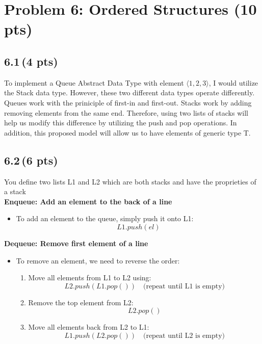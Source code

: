 \documentclass[12pt]{article}
\begin{document}
\section*{Problem 6: Ordered Structures (10 pts)}

\subsection*{6.1\,(4 pts)}

To implement a Queue Abstract Data Type with element  $\langle 1,2,3 \rangle$, I would utilize the Stack data type. However, these two different data types operate differently. Queues work with the priniciple of first-in and first-out. Stacks work by adding removing elements from the same end. Therefore, using two lists of stacks will help us modify this difference by utilizing the push and pop operations. In addition, this proposed model will allow us to have elements of generic type T.

\subsection*{6.2\,(6 pts)}
You define two lists L1 and L2 which are both stacks and have the proprieties of a stack\\
\textbf{Enqueue: Add an element to the back of a line}
\begin{itemize}
    \item To add an element to the queue, simply push it onto L1:
    \begin{equation*}
        L1.push(el)
    \end{equation*}
\end{itemize}
\textbf{Dequeue: Remove first element of a line}
\begin{itemize}
    \item To remove an element, we need to reverse the order:
    \begin{enumerate}
        \item Move all elements from L1 to L2 using:
        \begin{equation*}
            L2.push(L1.pop()) \quad \text{(repeat until L1 is empty)}
        \end{equation*}
        \item Remove the top element from L2:
        \begin{equation*}
            L2.pop()
        \end{equation*}
        \item Move all elements back from L2 to L1:
        \begin{equation*}
            L1.push(L2.pop()) \quad \text{(repeat until L2 is empty)}
        \end{equation*}
    \end{enumerate}
\end{itemize}
\end{document}
